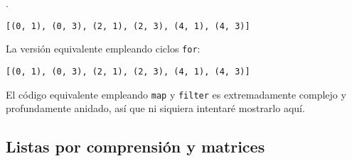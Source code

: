 \begin{code} .

\begin{Shaded}
\begin{Highlighting}[]
\NormalTok{[(x,y) } \NormalTok{(}\NormalTok{) }\OperatorTok{\%}\OperatorTok{==}  \NormalTok{(}\NormalTok{) }\OperatorTok{\%}\OperatorTok{==}\NormalTok{]}
\end{Highlighting}
\end{Shaded}

\begin{verbatim}
[(0, 1), (0, 3), (2, 1), (2, 3), (4, 1), (4, 3)]
\end{verbatim}

La versión equivalente empleando ciclos \texttt{for}:

\begin{Shaded}
\begin{Highlighting}[]
\OperatorTok{=}\NormalTok{ []}
 \NormalTok{(}\NormalTok{):}
    \OperatorTok{\%}\OperatorTok{==}\NormalTok{:}
         \NormalTok{(}\NormalTok{):}
            \OperatorTok{\%}\OperatorTok{==}\NormalTok{:}

\end{Highlighting}
\end{Shaded}

\begin{verbatim}
[(0, 1), (0, 3), (2, 1), (2, 3), (4, 1), (4, 3)]
\end{verbatim}
\end{code}

El código equivalente empleando \texttt{map} y \texttt{filter} es
extremadamente complejo y profundamente anidado, así que ni siquiera
intentaré mostrarlo aquí.

\subsection{Listas por comprensión y matrices}


